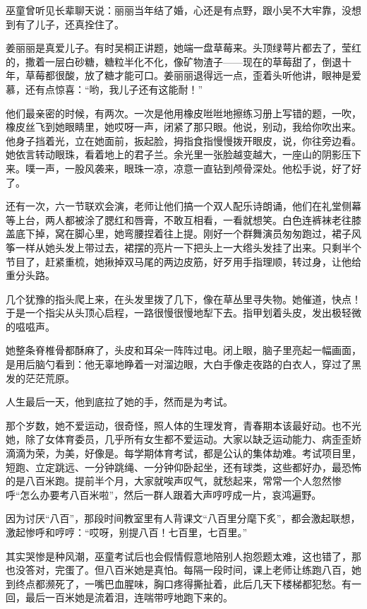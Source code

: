 \documentclass[lang=cn,newtx,12pt,scheme=chinese]{elegantbook}
\begin{document}
巫童曾听见长辈聊天说：丽丽当年结了婚，心还是有点野，跟小吴不大牢靠，没想到有了儿子，还真拴住了。

姜丽丽是真爱儿子。有时吴桐正讲题，她端一盘草莓来。头顶绿萼片都去了，莹红的，撒着一层白砂糖，糖粒半化不化，像矿物渣子——现在的草莓甜了，倒退十年，草莓都很酸，放了糖才能可口。姜丽丽退得远一点，歪着头听他讲，眼神是爱慕，还有点惊喜：“哟，我儿子还有这能耐！”

他们最亲密的时候，有两次。一次是他用橡皮咝咝地擦练习册上写错的题，一吹，橡皮丝飞到她眼睛里，她哎呀一声，闭紧了那只眼。他说，别动，我给你吹出来。他身子挡着光，立在她面前，扳起脸，拇指食指慢慢拨开眼皮，说，你往旁边看。她依言转动眼珠，看着地上的君子兰。余光里一张脸越变越大，一座山的阴影压下来。噗一声，一股风袭来，眼珠一凉，凉意一直钻到颅骨深处。他松手说，好了好了。

还有一次，六一节联欢会演，老师让他们搞一个双人配乐诗朗诵，他们在礼堂侧幕等上台，两人都被涂了腮红和唇膏，不敢互相看，一看就想笑。白色连裤袜老往膝盖底下掉，窝在脚心里，她弯腰捏着往上提。刚好一个群舞演员匆匆跑过，裙子风筝一样从她头发上带过去，裙摆的亮片一下把头上一大绺头发挂了出来。只剩半个节目了，赶紧重梳，她揪掉双马尾的两边皮筋，好歹用手指理顺，转过身，让他给重分头路。

几个犹豫的指头爬上来，在头发里拨了几下，像在草丛里寻失物。她催道，快点！于是一个指尖从头顶心启程，一路很慢很慢地犁下去。指甲划着头皮，发出极轻微的嗞嗞声。

她整条脊椎骨都酥麻了，头皮和耳朵一阵阵过电。闭上眼，脑子里亮起一幅画面，是用后脑勺看到：他无辜地睁着一对溜边眼，大白手像走夜路的白衣人，穿过了黑发的茫茫荒原。

人生最后一天，他到底拉了她的手，然而是为考试。

那个岁数，她不爱运动，很奇怪，照人体的生理发育，青春期本该最好动。也不光她，除了女体育委员，几乎所有女生都不爱运动。大家以缺乏运动能力、病歪歪娇滴滴为荣，为美，好像是。每学期体育考试，都是公认的集体劫难。考试项目里，短跑、立定跳远、一分钟跳绳、一分钟仰卧起坐，还有球类，这些都好办，最恐怖的是八百米跑。提前半个月，大家就唉声叹气，就愁起来，常常一个人忽然惨呼“怎么办要考八百米啦”，然后一群人跟着大声哼哼成一片，哀鸿遍野。

因为讨厌“八百”，那段时间教室里有人背课文“八百里分麾下炙”，都会激起联想，激起惨呼和哼哼：“哎呀，别提八百！七百里，七百里。”

其实哭惨是种风潮，巫童考试后也会假情假意地陪别人抱怨题太难，这也错了，那也没答对，完蛋了。但八百米她是真怕。每隔一段时间，课上老师让练跑八百，她到终点都濒死了，一嘴巴血腥味，胸口疼得撕扯着，此后几天下楼梯都犯愁。有一回，最后一百米她是流着泪，连喘带哼地跑下来的。
\end{document}
